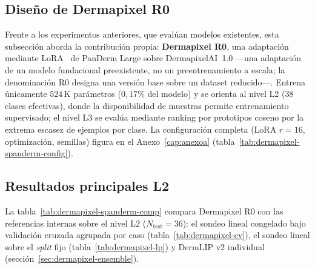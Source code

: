 \subsection{Diseño de Dermapixel R0}

Frente a los experimentos anteriores, que evalúan modelos existentes,
esta subsección aborda la contribución propia: \textbf{Dermapixel R0},
una adaptación mediante LoRA~\cite{lora} de PanDerm Large sobre
DermapixelAI~1.0 ---una adaptación de un modelo fundacional
preexistente, no un preentrenamiento a escala; la denominación R0
designa una versión base sobre un dataset reducido---. Entrena
únicamente $524$\,K parámetros ($0{,}17\%$ del modelo) y se orienta al
nivel L2 ($38$ clases efectivas), donde la disponibilidad de muestras
permite entrenamiento supervisado; el nivel L3 se evalúa mediante
ranking por prototipos coseno por la extrema escasez de ejemplos por
clase. La configuración completa (LoRA $r=16$, optimización,
semillas) figura en el Anexo~\ref{cap:anexoa}
(tabla~\ref{tab:dermapixel-spanderm-config}).

\subsection{Resultados principales L2}

La tabla~\ref{tab:dermapixel-spanderm-comp} compara Dermapixel R0 con
las referencias internas sobre el nivel L2 ($N_{\mathrm{test}} = 36$):
el sondeo lineal congelado bajo validación cruzada agrupada por caso
(tabla~\ref{tab:dermapixel-cv}), el sondeo lineal sobre el \emph{split}
fijo (tabla~\ref{tab:dermapixel-lp}) y DermLIP v2 individual
(sección~\ref{sec:dermapixel-ensemble}).

